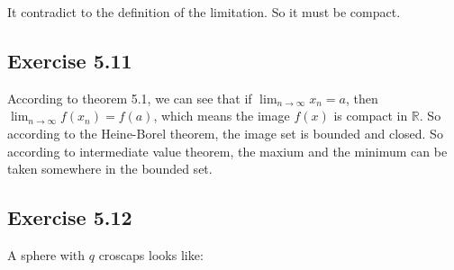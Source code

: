 \documentclass[]{ctexart}
\begin{document}
		It contradict to the definition of the limitation. So it must be compact. 
	
	\subsection{Exercise 5.11}
		According to theorem 5.1, we can see that if $\lim_{n\rightarrow \infty}x_n=a$, then $\lim_{n\rightarrow \infty}f(x_n)=f(a)$, which means the image $f(x)$ is compact in $\mathbb{R}$. So according to the Heine-Borel theorem, the image set is bounded and closed. So according to intermediate value theorem, the maxium and the minimum can be taken somewhere in the bounded set. 
	
	\subsection{Exercise 5.12}
		A sphere with $ q $ croscaps looks like:
\end{document}
